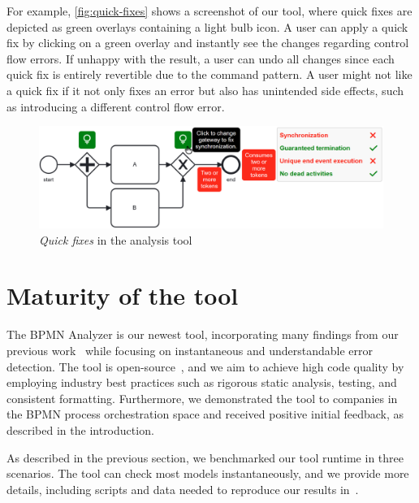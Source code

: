 \documentclass[
twocolumn
]{ceurart}
\begin{document}
For example, \autoref{fig:quick-fixes} shows a screenshot of our tool, where quick fixes are depicted as green overlays containing a light bulb icon.
A user can apply a quick fix by clicking on a green overlay and instantly see the changes regarding control flow errors.
If unhappy with the result, a user can undo all changes since each quick fix is entirely revertible due to the command pattern.
A user might not like a quick fix if it not only fixes an error but also has unintended side effects, such as introducing a different control flow error.

\begin{figure}[ht]
	\centering
	\includegraphics[width=1\linewidth]{images/quick-fix}
	\caption{\textit{Quick fixes} in the analysis tool}
	\label{fig:quick-fixes}
\end{figure}

\section{Maturity of the tool} \label{sec:maturity}
The BPMN Analyzer is our newest tool, incorporating many findings from our previous work~\cite{krauterFormalizationAnalysisBPMN2023} while focusing on instantaneous and understandable error detection.
The tool is open-source~\cite{krauterInstantaneousComprehensibleFixable2024}, and we aim to achieve high code quality by employing industry best practices such as rigorous static analysis, testing, and consistent formatting.
Furthermore, we demonstrated the tool to companies in the BPMN process orchestration space and received positive initial feedback, as described in the introduction.

As described in the previous section, we benchmarked our tool runtime in three scenarios.
The tool can check most models instantaneously, and we provide more details, including scripts and data needed to reproduce our results in~\cite{krauterInstantaneousComprehensibleFixable2024}.
\end{document}
